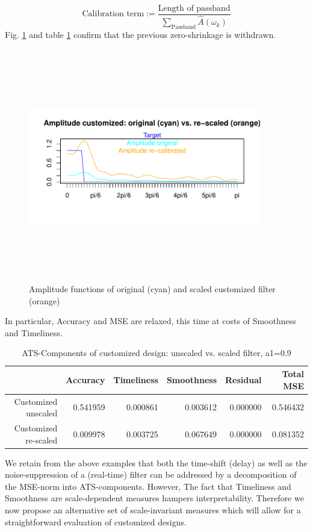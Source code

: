 \documentclass[a4paper]{book}
\begin{document}
\[
\textrm{Calibration~term}:=\frac{\textrm{Length~of~passband}}{\sum_{\textrm{Passband}}\hat{A}(\omega_k)}
\]
Fig. \ref{z_box_plot_amp_and_shift_cust_ST_1_scaled_unscaled} and table \ref{ats_comp_dfa_ST_1_scaled_unscaled} confirm that the previous zero-shrinkage is withdrawn.
\begin{figure}[H]\begin{center}\includegraphics[height=4in, width=4in]{z_box_plot_amp_and_shift_cust_ST_1_scaled_unscaled}\caption{Amplitude functions of original (cyan) and scaled customized filter (orange)\label{z_box_plot_amp_and_shift_cust_ST_1_scaled_unscaled}}\end{center}\end{figure}In particular, Accuracy and MSE are relaxed, this time at costs of Smoothness and Timeliness.  
\begin{table}[ht]
\centering
\begin{tabular}{rrrrrr}
  \hline
 & Accuracy & Timeliness & Smoothness & Residual & Total MSE \\ 
  \hline
Customized unscaled & 0.541959 & 0.000861 & 0.003612 & 0.000000 & 0.546432 \\ 
  Customized re-scaled & 0.009978 & 0.003725 & 0.067649 & 0.000000 & 0.081352 \\ 
   \hline
\end{tabular}
\caption{ATS-Components of customized design: unscaled vs. scaled filter, a1=0.9} 
\label{ats_comp_dfa_ST_1_scaled_unscaled}
\end{table}We retain from the above examples that both the time-shift (delay) as well as the noise-suppression of a (real-time) filter can be addressed by a decomposition of the MSE-norm into ATS-components. However, The fact that Timeliness and Smoothness are scale-dependent measures hampers interpretability. Therefore we now propose an alternative set of scale-invariant measures which will allow for a straightforward evaluation of customized designs. 
\end{document}
